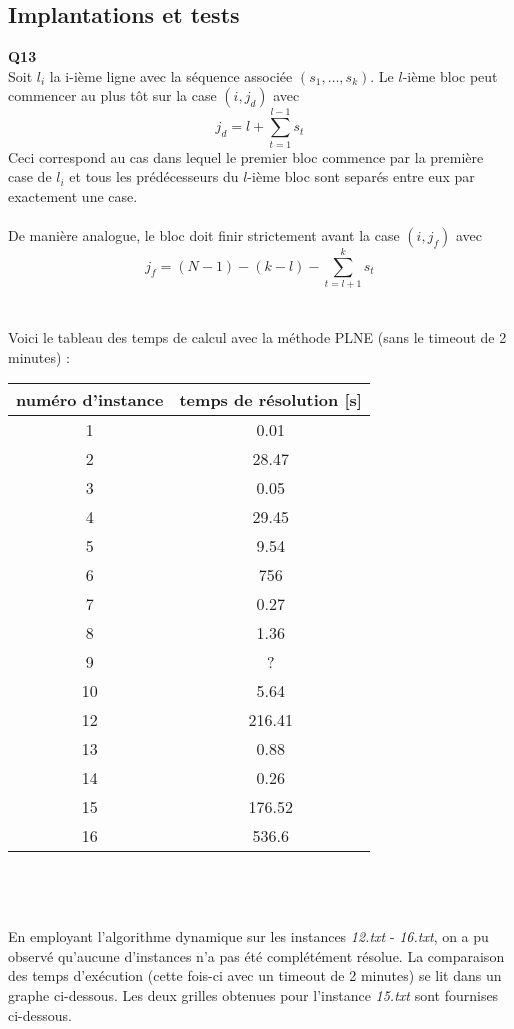\documentclass[10pt,a4paper]{article}
\begin{document}
\subsection{Implantations et tests}
\noindent
\textbf{Q13} \\ 
\noindent
Soit $l_i$ la i-ième ligne avec la séquence associée $(s_1, \hdots, s_k)$. Le $l$-ième bloc peut commencer au plus tôt sur la case $(i,j_d)$ avec $$j_d = l + \sum_{t = 1}^ {l-1} s_t$$
Ceci correspond au cas dans lequel le premier bloc commence par la première case de $l_i$ et tous les prédécesseurs du $l$-ième bloc sont separés entre eux par exactement une case. \\ \\
\noindent
De manière analogue, le bloc doit finir strictement avant la case $(i, j_f)$ avec 
$$ j_f = (N-1) - (k-l) - \sum_{t = l+1}^k s_t$$
\\ \\
\noindent
Voici le tableau des temps de calcul avec la méthode PLNE (sans le timeout de 2 minutes) : \\
\begin{tabular}{|c|c|}
\hline
numéro d'instance & temps de résolution [s]\\
\hline
\hline
1  & 0.01\\
\hline
2 & 28.47\\
\hline
3 & 0.05\\
\hline
4 & 29.45\\
\hline
5 & 9.54\\
\hline
6 & 756\\
\hline
7 & 0.27\\
\hline
8 & 1.36\\
\hline
9 & ?\\
\hline
10 & 5.64\\
\hline
12 & 216.41\\
\hline
13 & 0.88\\
\hline
14 & 0.26\\
\hline
15 & 176.52\\
\hline
16 & 536.6\\ 
\hline

\end{tabular} 
\\ \\  \\
\noindent
En employant l'algorithme dynamique sur les instances \textit{12.txt} - \textit{16.txt}, on a pu observé qu'aucune d'instances n'a pas été complétément résolue. La comparaison des temps d'exécution (cette fois-ci avec un timeout de 2 minutes) se lit dans un graphe ci-dessous. Les deux grilles obtenues pour l'instance \textit{15.txt} sont fournises ci-dessous. \\ 
\end{document}
